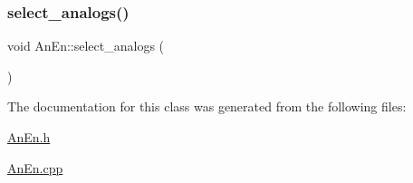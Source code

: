 \mbox{\label{class_an_en_a179079dda478bf08e1a2937e9e17e51c}} 
\subsubsection{\texorpdfstring{select\+\_\+analogs()}{select\_analogs()}}
{\footnotesize\ttfamily void An\+En\+::select\+\_\+analogs (\begin{DoxyParamCaption}{ }\end{DoxyParamCaption})}



The documentation for this class was generated from the following files\+:\begin{DoxyCompactItemize}
\item 
\mbox{\hyperlink{_an_en_8h}{An\+En.\+h}}\item 
\mbox{\hyperlink{_an_en_8cpp}{An\+En.\+cpp}}\end{DoxyCompactItemize}
